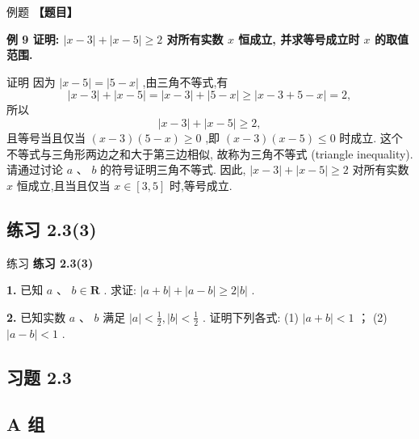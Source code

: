 \documentclass[a4paper,10pt,oneside,fontset=none]{ctexbook}
\renewcommand{\geq}{\geqslant}
\renewcommand{\leq}{\leqslant}
\newcounter{example}[chapter]
\newenvironment{example}[1][]{\begin{exBox}{例题}{#1}}{\end{exBox}}
\newenvironment{exercise}[1][]{\begin{exBox}{练习}{#1}}{\end{exBox}}
\numberwithin{equation}{chapter}
\begin{document}
\begin{example}
\textbf{【题目】}\par\vspace{0.3em}
\textbf{例 9 证明: $\left| {x - 3}\right|  + \left| {x - 5}\right|  \geq  2$ 对所有实数 $x$ 恒成立, 并求等号成立时 $x$ 的取值范围.}\par\vspace{0.3em}
证明 因为 $\left| {x - 5}\right|  = \left| {5 - x}\right|$ ,由三角不等式,有
$$
\left| {x - 3}\right|  + \left| {x - 5}\right|  = \left| {x - 3}\right|  + \left| {5 - x}\right|  \geq  \left| {x - 3 + 5 - x}\right|  = 2,
$$
所以
$$
\left| {x - 3}\right|  + \left| {x - 5}\right|  \geq  2,
$$
且等号当且仅当 $\left( {x - 3}\right) \left( {5 - x}\right)  \geq  0$ ,即 $\left( {x - 3}\right) \left( {x - 5}\right)  \leq  0$ 时成立.
这个不等式与三角形两边之和大于第三边相似, 故称为三角不等式 (triangle inequality).
请通过讨论 $a\text{ 、 }b$ 的符号证明三角不等式.
因此, $\left| {x - 3}\right|  + \left| {x - 5}\right|  \geq  2$ 对所有实数 $x$ 恒成立,且当且仅当 $x \in  \left\lbrack  {3,5}\right\rbrack$ 时,等号成立.
\end{example}

\subsection*{练习 2.3(3)}

\begin{exercise}
\textbf{练习 2.3(3)}\par\vspace{0.5em}
\textbf{1.} 已知 $a\text{ 、 }b \in  \mathbf{R}$ . 求证: $\left| {a + b}\right|  + \left| {a - b}\right|  \geq  2\left| b\right|$ .
\par\vspace{0.8em}
\textbf{2.} 已知实数 $a\text{ 、 }b$ 满足 $\left| a\right|  < \frac{1}{2},\left| b\right|  < \frac{1}{2}$ . 证明下列各式: (1) $\left| {a + b}\right|  < 1$ ； (2) $\left| {a - b}\right|  < 1$ .
\end{exercise}

\subsection*{习题 2.3}

\subsection*{A 组}
\end{document}
